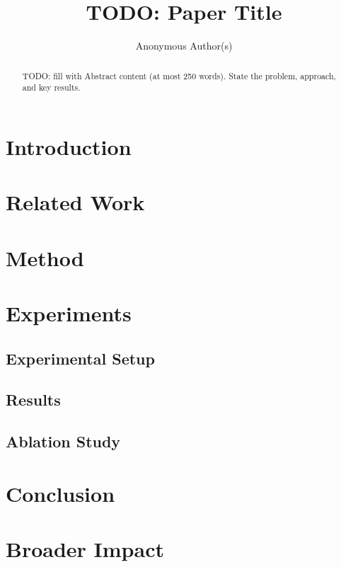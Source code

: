 \documentclass{article}
\title{TODO: Paper Title}
\author{Anonymous Author(s)}
\begin{document}
\maketitle

\begin{abstract}
TODO: fill with Abstract content (at most 250 words). State the problem, approach, and key results.
\end{abstract}

\section{Introduction}

\section{Related Work}

\section{Method}

\section{Experiments}

\subsection{Experimental Setup}

\subsection{Results}

\subsection{Ablation Study}

\section{Conclusion}

\section*{Broader Impact}



\end{document}
